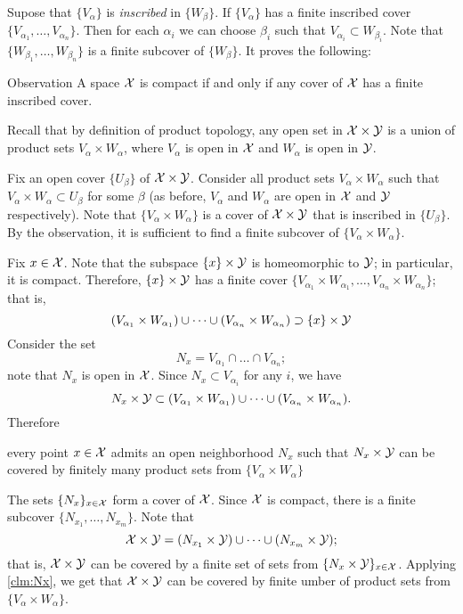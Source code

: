 Supose that $\{V_\alpha\}$ is \emph{inscribed} in $\{W_\beta\}$.
If $\{V_\alpha\}$ has a finite inscribed cover $\{V_{\alpha_1},\dots,V_{\alpha_n}\}$.
Then for each $\alpha_i$ we can choose $\beta_i$ such that $V_{\alpha_i}\subset  W_{\beta_i}$.
Note that $\{W_{\beta_1},\dots,W_{\beta_n}\}$ is a finite subcover of $\{W_\beta\}$.
It proves the following:

\begin{thm}{Observation}\label{obs:inscribed-cover}
A space $\mathcal{X}$ is compact if and only if any cover of $\mathcal{X}$ has a finite inscribed cover. 
\end{thm}

Recall that by definition of product topology, any open set in $\mathcal{X}\times\mathcal{Y}$ is a union of product sets 
$V_\alpha\times W_\alpha$, where $V_\alpha$ is open in $\mathcal{X}$ and $W_\alpha$ is open in $\mathcal{Y}$.

Fix an open cover $\{U_\beta\}$ of $\mathcal{X}\times\mathcal{Y}$.
Consider all product sets $V_\alpha\times W_\alpha$ such that $V_\alpha\times W_\alpha\subset U_\beta$ for some $\beta$ (as before, $V_\alpha$ and $W_\alpha$ are open in $\mathcal{X}$ and $\mathcal{Y}$ respectively).
Note that $\{V_\alpha\times W_\alpha\}$ is a cover of $\mathcal{X}\times\mathcal{Y}$ that is inscribed in $\{U_\beta\}$.
By the observation, it is sufficient to find a finite subcover of $\{V_\alpha\times W_\alpha\}$.

Fix $x \in \mathcal{X}$.
Note that the subspace $\{x\}\times \mathcal{Y}$ is homeomorphic to $\mathcal{Y}$;
in particular, it is compact.
Therefore, $\{x\}\times \mathcal{Y}$ has a finite cover $\{V_{\alpha_1}\times W_{\alpha_1},\dots,V_{\alpha_n}\times W_{\alpha_n}\}$; that is,
\[(V_{\alpha_1}\times W_{\alpha_1})\cup\dots\cup
(V_{\alpha_n}\times W_{\alpha_n})
\supset \{x\}\times \mathcal{Y}\]
Consider the set
\[N_x=V_{\alpha_1}\cap\dots\cap V_{\alpha_n};\]
note that $N_x$ is  open in $\mathcal{X}$.
Since $N_x\subset V_{\alpha_i}$ for any $i$, we have
\[N_x\times \mathcal{Y}\subset (V_{\alpha_1}\times W_{\alpha_1})\cup\dots\cup
(V_{\alpha_n}\times W_{\alpha_n}).\]
Therefore
\begin{clm}{}\label{clm:Nx}
every point $x\in\mathcal{X}$ admits an open neighborhood $N_x$ such that $N_x\times \mathcal{Y}$ can be covered by finitely many product sets from $\{V_\alpha\times W_\alpha\}$
\end{clm}


The sets $\{N_x\}_{x\in\mathcal{X}}$ form a cover of $\mathcal{X}$.
Since $\mathcal{X}$ is compact, 
there is a finite subcover $\{N_{x_1},\dots,N_{x_m}\}$.
Note that 
\[\mathcal{X}\times\mathcal{Y}=(N_{x_1}\times \mathcal{Y})\cup\dots\cup (N_{x_m}\times \mathcal{Y});\]
that is, $\mathcal{X}\times\mathcal{Y}$ can be covered by a finite set of sets from $\{N_x\times \mathcal{Y}\}_{x\in\mathcal{X}}$.
Applying \ref{clm:Nx}, we get that $\mathcal{X}\times\mathcal{Y}$ can be covered by finite umber of product sets from $\{V_\alpha\times W_\alpha\}$.
\qeds





